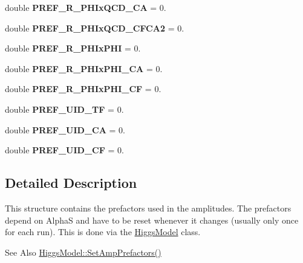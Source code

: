 \begin{DoxyCompactItemize}
\item 
\hypertarget{structAmplitudePrefactors_a3332117361ca8a16b9e8180edc5a856e}{double {\bfseries P\-R\-E\-F\-\_\-\-R\-\_\-\-P\-H\-Ix\-Q\-C\-D\-\_\-\-C\-A} = 0.}\label{structAmplitudePrefactors_a3332117361ca8a16b9e8180edc5a856e}

\item 
\hypertarget{structAmplitudePrefactors_a2ab8c22d4b4dd16098106050c8cd26c9}{double {\bfseries P\-R\-E\-F\-\_\-\-R\-\_\-\-P\-H\-Ix\-Q\-C\-D\-\_\-\-C\-F\-C\-A2} = 0.}\label{structAmplitudePrefactors_a2ab8c22d4b4dd16098106050c8cd26c9}

\item 
\hypertarget{structAmplitudePrefactors_aa20df6cf1cad934b15628e2f244c1b89}{double {\bfseries P\-R\-E\-F\-\_\-\-R\-\_\-\-P\-H\-Ix\-P\-H\-I} = 0.}\label{structAmplitudePrefactors_aa20df6cf1cad934b15628e2f244c1b89}

\item 
\hypertarget{structAmplitudePrefactors_ae0ac50c6e0e5bac053c18785b389a275}{double {\bfseries P\-R\-E\-F\-\_\-\-R\-\_\-\-P\-H\-Ix\-P\-H\-I\-\_\-\-C\-A} = 0.}\label{structAmplitudePrefactors_ae0ac50c6e0e5bac053c18785b389a275}

\item 
\hypertarget{structAmplitudePrefactors_a3fdf0463a7e4729880fc367f0dec709d}{double {\bfseries P\-R\-E\-F\-\_\-\-R\-\_\-\-P\-H\-Ix\-P\-H\-I\-\_\-\-C\-F} = 0.}\label{structAmplitudePrefactors_a3fdf0463a7e4729880fc367f0dec709d}

\item 
\hypertarget{structAmplitudePrefactors_ad526e1b29ac995cb3391aa379cc78258}{double {\bfseries P\-R\-E\-F\-\_\-\-U\-I\-D\-\_\-\-T\-F} = 0.}\label{structAmplitudePrefactors_ad526e1b29ac995cb3391aa379cc78258}

\item 
\hypertarget{structAmplitudePrefactors_aa0a79b24cb1a3945707096c67137e495}{double {\bfseries P\-R\-E\-F\-\_\-\-U\-I\-D\-\_\-\-C\-A} = 0.}\label{structAmplitudePrefactors_aa0a79b24cb1a3945707096c67137e495}

\item 
\hypertarget{structAmplitudePrefactors_ae71c22dacafd69cb40fbb3c73cbb3b23}{double {\bfseries P\-R\-E\-F\-\_\-\-U\-I\-D\-\_\-\-C\-F} = 0.}\label{structAmplitudePrefactors_ae71c22dacafd69cb40fbb3c73cbb3b23}

\end{DoxyCompactItemize}


\subsection{Detailed Description}
This structure contains the prefactors used in the amplitudes. The prefactors depend on Alpha\-S and have to be reset whenever it changes (usually only once for each run). This is done via the \hyperlink{classHiggsModel}{Higgs\-Model} class. \begin{DoxySeeAlso}{See Also}
\hyperlink{classHiggsModel_a514e3dd7854409c622b8e200fe2ee84c}{Higgs\-Model\-::\-Set\-Amp\-Prefactors()} 
\end{DoxySeeAlso}


